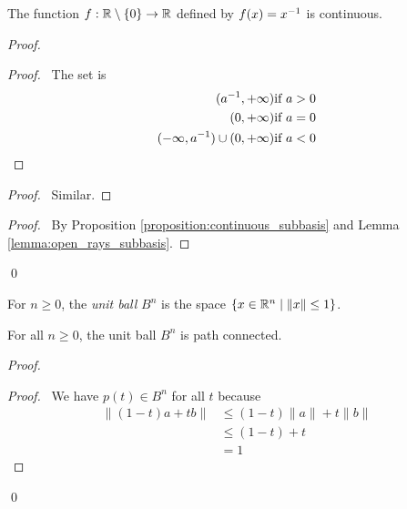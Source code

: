 \begin{theorem}
    The function $f : \mathbb{R} \setminus \{ 0 \} \rightarrow \mathbb{R}$ defined by $f(x) = {x}^{-1}$ is continuous.
\end{theorem}

\begin{proof}
    \pf
    \begin{proof}
        \pf\ The set is
        \begin{align*}
            ({a}^{-1}, + \infty) & \text{if } a > 0 \\
            (0, + \infty) & \text{if } a = 0 \\
            (- \infty, {a}^{-1}) \cup (0, + \infty) & \text{if } a < 0
        \end{align*}
    \end{proof}
    \begin{proof}
        \pf\ Similar.
    \end{proof}
    \qedstep
    \begin{proof}
        \pf\ By Proposition \ref{proposition:continuous_subbasis} and Lemma
        \ref{lemma:open_rays_subbasis}.
    \end{proof}
    \qed
\end{proof}

\begin{definition}
    For $n \geq 0$, the \emph{unit ball} $B^n$ is the space $\{ x \in \mathbb{R}^n \mid \| x \| \leq 1 \}$.
\end{definition}

\begin{proposition}
    For all $n \geq 0$, the unit ball $B^n$ is path connected.
\end{proposition}

\begin{proof}
    \pf
    \begin{proof}
        \pf\ We have $p(t) \in B^n$ for all $t$ because
        \begin{align*}
            \| (1-t)a + tb \| & \leq (1-t) \| a \| + t \| b \| \\
            & \leq (1-t) + t \\
            & = 1
        \end{align*}
    \end{proof}
    \qed
\end{proof}

